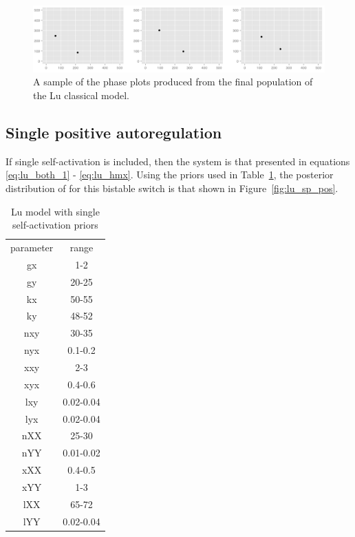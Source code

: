 \begin{figure}[htbp]
\centering
\includegraphics[scale=0.2]{chapterStabilityFinder/Lu_switches/images/classic/phase_plot.png}
\caption{A sample of the phase plots produced from the final population of the Lu classical model.}
\label{fig:lu_phase}
\end{figure}
\clearpage

\subsection{Single positive autoregulation}

If single self-activation is included, then the system is that presented in equations \ref{eq:lu_both_1} - \ref{eq:lu_hmx}. Using the priors used in Table~\ref{tab:lu_sp_pr}, the posterior distribution of for this bistable switch is that shown in Figure~\ref{fig:lu_sp_pos}. 

\begin{table}[htbp]
\centering
\caption{Lu model with single self-activation priors}
\label{tab:lu_sp_pr}
\begin{tabular}{cc}
parameter & range \\
gx & 1-2 \\
gy & 20-25 \\
kx & 50-55 \\
ky & 48-52 \\
nxy & 30-35 \\
nyx & 0.1-0.2 \\
xxy & 2-3 \\
xyx & 0.4-0.6 \\
lxy & 0.02-0.04 \\
lyx & 0.02-0.04 \\
nXX & 25-30  \\
nYY & 0.01-0.02 \\
xXX & 0.4-0.5 \\
xYY & 1-3 \\
lXX & 65-72 \\
lYY & 0.02-0.04
\end{tabular}
\end{table}


